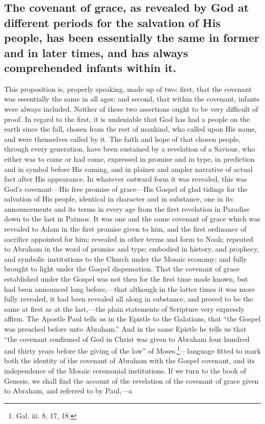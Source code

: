 \documentclass[]{book}
\begin{document}
\hypertarget{the-covenant-of-grace-as-revealed-by-god-at-different-periods-for-the-salvation-of-his-people-has-been-essentially-the-same-in-former-and-in-later-times-and-has-always-comprehended-infants-within-it.}{%
\subsection{The covenant of grace, as revealed by God at different periods for the salvation of His people, has been essentially the same in former and in later times, and has always comprehended infants within it.}\label{the-covenant-of-grace-as-revealed-by-god-at-different-periods-for-the-salvation-of-his-people-has-been-essentially-the-same-in-former-and-in-later-times-and-has-always-comprehended-infants-within-it.}}

This proposition is, properly speaking, made up of two: first, that the covenant was essentially the same in all ages; and second, that within the covenant, infants were always included. Neither of these two assertions ought to be very difficult of proof. In regard to the first, it is undeniable that God has had a people on the earth since the fall, chosen from the rest of mankind, who called upon His name, and were themselves called by it. The faith and hope of that chosen people, through every generation, have been sustained by a revelation of a Saviour, who either was to come or had come, expressed in promise and in type, in prediction and in symbol before His coming, and in plainer and ampler narrative of actual fact after His appearance. In whatever outward form it was revealed, this was God's covenant---His free promise of grace---His Gospel of glad tidings for the salvation of His people, identical in character and in substance, one in its announcements and its terms in every age from the first revelation in Paradise down to the last in Patmos. It was one and the same covenant of grace which was revealed to Adam in the first promise given to him, and the first ordinance of sacrifice appointed for him; revealed in other terms and form to Noah; repeated to Abraham in the word of promise and type; embodied in history, and prophecy, and symbolic institutions to the Church under the Mosaic economy; and fully brought to light under the Gospel dispensation. That the covenant of grace established under the Gospel was not then for the first time made known, but had been announced long before,---that although in the latter times it was more fully revealed, it had been revealed all along in substance, and proved to be the same at first as at the last,---the plain statements of Scripture very expressly affirm. The Apostle Paul tells us in the Epistle to the Galatians, that ``the Gospel was preached before unto Abraham.'' And in the same Epistle he tells us that ``the covenant confirmed of God in Christ was given to Abraham four hundred and thirty years before the giving of the law'' of Moses,\footnote{Gal. iii. 8, 17, 18.}---language fitted to mark both the identity of the covenant of Abraham with the Gospel covenant, and its independence of the Mosaic ceremonial institutions. If we turn to the book of Genesis, we shall find the account of the revelation of the covenant of grace given to Abraham, and referred to by Paul,---a 
\end{document}
